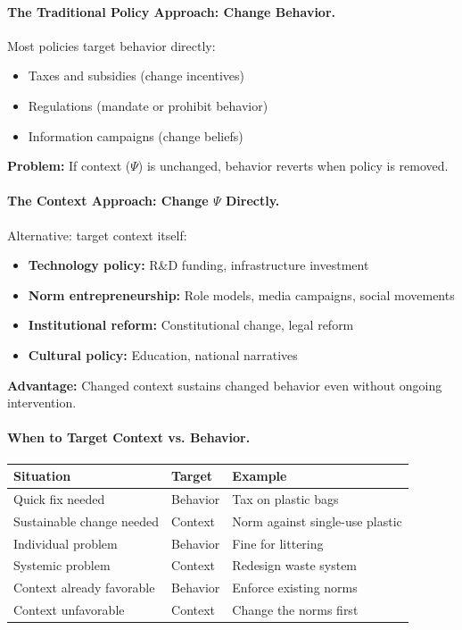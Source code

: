 \documentclass[12pt,a4paper]{article}
\begin{document}
\paragraph{The Traditional Policy Approach: Change Behavior.}
Most policies target behavior directly:
\begin{itemize}
  \item Taxes and subsidies (change incentives)
  \item Regulations (mandate or prohibit behavior)
  \item Information campaigns (change beliefs)
\end{itemize}

\textbf{Problem:} If context ($\Psi$) is unchanged, behavior reverts when policy is removed.

\paragraph{The Context Approach: Change $\Psi$ Directly.}
Alternative: target context itself:
\begin{itemize}
  \item \textbf{Technology policy:} R\&D funding, infrastructure investment
  \item \textbf{Norm entrepreneurship:} Role models, media campaigns, social movements
  \item \textbf{Institutional reform:} Constitutional change, legal reform
  \item \textbf{Cultural policy:} Education, national narratives
\end{itemize}

\textbf{Advantage:} Changed context sustains changed behavior even without ongoing intervention.

\paragraph{When to Target Context vs. Behavior.}

\begin{center}
\renewcommand{\arraystretch}{1.3}
\begin{tabular}{lll}
\hline
\textbf{Situation} & \textbf{Target} & \textbf{Example} \\
\hline
Quick fix needed & Behavior & Tax on plastic bags \\
Sustainable change needed & Context & Norm against single-use plastic \\
Individual problem & Behavior & Fine for littering \\
Systemic problem & Context & Redesign waste system \\
Context already favorable & Behavior & Enforce existing norms \\
Context unfavorable & Context & Change the norms first \\
\hline
\end{tabular}
\end{center}
\end{document}

